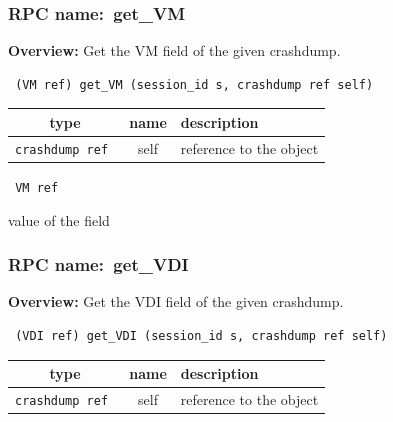 \subsubsection{RPC name:~get\_VM}

{\bf Overview:} 
Get the VM field of the given crashdump.

\begin{verbatim} (VM ref) get_VM (session_id s, crashdump ref self)\end{verbatim}



 
\vspace{0.3cm}
\begin{tabular}{|c|c|p{7cm}|}
 \hline
{\bf type} & {\bf name} & {\bf description} \\ \hline
{\tt crashdump ref } & self & reference to the object \\ \hline 

\end{tabular}

\vspace{0.3cm}

{\tt 
VM ref
}


value of the field
\vspace{0.3cm}
\vspace{0.3cm}
\vspace{0.3cm}
\subsubsection{RPC name:~get\_VDI}

{\bf Overview:} 
Get the VDI field of the given crashdump.

\begin{verbatim} (VDI ref) get_VDI (session_id s, crashdump ref self)\end{verbatim}



 
\vspace{0.3cm}
\begin{tabular}{|c|c|p{7cm}|}
 \hline
{\bf type} & {\bf name} & {\bf description} \\ \hline
{\tt crashdump ref } & self & reference to the object \\ \hline 

\end{tabular}

\vspace{0.3cm}

